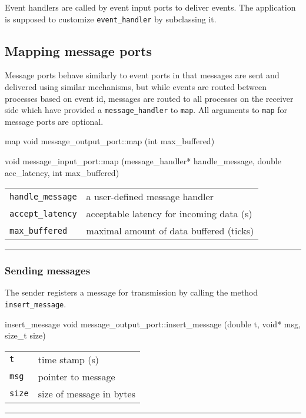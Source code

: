 \documentclass[a4paper,twoside]{report}
\makeatletter
\newenvironment{parameters}%
{\begin{tabular}{@{\hspace{2em}}lp{0.6\textwidth}}}%
{\end{tabular}\par\vspace{1mm}\par\hrule\par\vspace{5mm}}
\makeatother
\begin{document}
Event handlers are called by event input ports to deliver events.  The
application is supposed to customize \lstinline|event_handler| by
subclassing it.


\subsection{Mapping message ports}

Message ports behave similarly to event ports in that messages are
sent and delivered using similar mechanisms, but while events are
routed between processes based on event id, messages are routed to all
processes on the receiver side which have provided a
\lstinline|message_handler| to \lstinline|map|.  All arguments to
\lstinline|map| for message ports are optional.

\begin{head}{map}
  void message_output_port::map (int max_buffered)

  void message_input_port::map (message_handler* handle_message,
                                double acc_latency,
                                int max_buffered)
\end{head}
\begin{parameters}
  \lstinline|handle_message| & a user-defined message handler \\
  \lstinline|accept_latency| & acceptable latency for incoming data (s) \\
  \lstinline|max_buffered| & maximal amount of data buffered (ticks) \\
\end{parameters}


\subsubsection{Sending messages}

The sender registers a message for transmission by calling the method
\lstinline|insert_message|.

\begin{head}{insert_message}
  void message_output_port::insert_message (double t,
                                            void* msg,
                                            size_t size)
\end{head}
\begin{parameters}
  \lstinline|t| & time stamp (s) \\
  \lstinline|msg| & pointer to message \\
  \lstinline|size| & size of message in bytes \\
\end{parameters}
\end{document}
